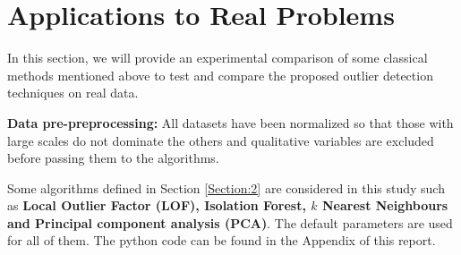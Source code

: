 \section{Applications to Real Problems}\label{Section:6}
In this section, we will provide an experimental comparison of some classical methods mentioned above to test and compare the proposed outlier detection techniques on real data.

\noindent\textbf{Data pre-preprocessing:} All datasets have been normalized  so that those with large scales do not dominate the others and qualitative variables are excluded before passing them to the algorithms.

\noindent Some algorithms defined in Section \ref{Section:2} are considered in this study such as \textbf{Local Outlier Factor (LOF), Isolation Forest, $k$ Nearest Neighbours and Principal component analysis (PCA)}. The default parameters are used for all of them. The python code can be found in the Appendix of this report. \newl

